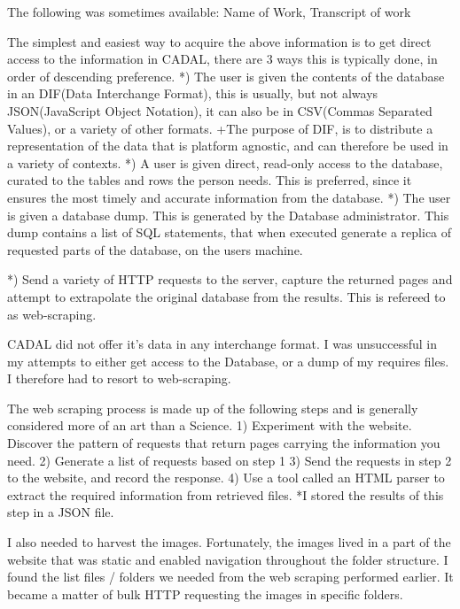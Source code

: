             The following was sometimes available:
                Name of Work,
                Transcript of work
                
            The simplest and easiest way to acquire the above information is to get direct access to the information in CADAL, there are 3 ways this is typically done, in order of descending preference.
            *)  The user is given the contents of the database in an DIF(Data Interchange Format), this is usually, but not always JSON(JavaScript Object Notation), it can also be in CSV(Commas Separated Values), or a variety of other formats.
                +The purpose of DIF, is to distribute a representation of the data that is platform agnostic, and can  therefore be used in a variety of contexts.
            *)  A user is given direct, read-only access to the database, curated to the tables and rows the person needs.  This is preferred, since it ensures the most timely and accurate information from the database.
            *)  The user is given a database dump.  This is generated by the Database administrator.  This dump contains a list of SQL statements, that when executed generate a replica of requested parts of the database, on the users machine.

            *)  Send a variety of HTTP requests to the server, capture the returned pages and attempt to extrapolate the original database from the results.  This is refereed to as web-scraping.
            
            CADAL did not offer it's data in any interchange format.  I was unsuccessful in my attempts to either get access to the Database, or a dump of my requires files.  I therefore had to resort to web-scraping.
            
            The web scraping process is made up of the following steps and is generally considered more of an art than a Science.
                1)  Experiment with the website.  Discover the pattern of requests that return pages carrying the information you need.
                2)  Generate a list of requests based on step 1
                3)  Send the requests in step 2 to the website, and record the response.
                4)  Use a tool called an HTML parser to extract the required information from retrieved files.
                    *I stored the results of this step in a JSON file.
                
            I also needed to harvest the images.  Fortunately, the images lived in a part of the website that was static and enabled navigation throughout the folder structure.  I found the list files / folders we needed from the web scraping performed earlier.  It became a matter of bulk HTTP requesting the images in specific folders.
            
